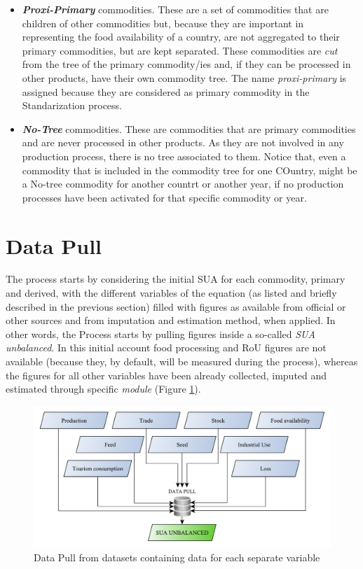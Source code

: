 \documentclass[]{article}
\providecommand{\tightlist}{%
  \setlength{\itemsep}{0pt}\setlength{\parskip}{0pt}}
\begin{document}
\begin{itemize}
\tightlist
\item
  \textbf{\emph{Proxi-Primary}} commodities. These are a set of
  commodities that are children of other commodities but, because they
  are important in representing the food availability of a country, are
  not aggregated to their primary commodities, but are kept separated.
  These commodities are \emph{cut} from the tree of the primary
  commodity/ies and, if they can be processed in other products, have
  their own commodity tree. The name \emph{proxi-primary} is assigned
  because they are considered as primary commodity in the Standarization
  process.
\item
  \textbf{\emph{No-Tree}} commodities. These are commodities that are
  primary commodities and are never processed in other products. As they
  are not involved in any production process, there is no tree
  associated to them. Notice that, even a commodity that is included in
  the commodity tree for one COuntry, might be a No-tree commodity for
  another countrt or another year, if no production processes have been
  activated for that specific commodity or year.
\end{itemize}

\section{Data Pull}\label{data-pull}

The process starts by considering the initial SUA for each commodity,
primary and derived, with the different variables of the equation (as
listed and briefly described in the previous section) filled with
figures as available from official or other sources and from imputation
and estimation method, when applied. In other words, the Process starts
by pulling figures inside a so-called \emph{SUA unbalanced}. In this
initial account food processing and RoU figures are not available
(because they, by default, will be measured during the process), whereas
the figures for all other variables have been already collected, imputed
and estimated through specific \emph{module} (Figure \ref{fig:f1}).

\begin{figure}[htbp]
\centering
\includegraphics{images/01_pulldata.pdf}
\caption{\label{fig:f1}Data Pull from datasets containing data for each
separate variable}
\end{figure}
\end{document}
